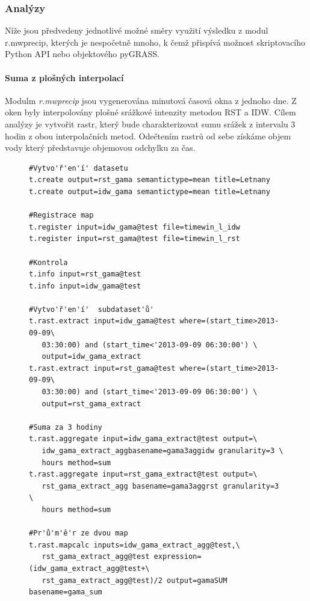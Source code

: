 \documentclass[a4paper,12pt,oneside]{report}
\begin{document}
\subsubsection*{Analýzy}
Níže jsou předvedeny jednotlivé možné směry využití výsledku z modul r.mwprecip, kterých je nespočetně mnoho, k čemž přispívá možnost skriptovacího Python API nebo objektového pyGRASS. 

\paragraph*{Suma z plošných interpolací}
Modulm \emph{r.mwprecip} jsou vygenerována minutová časová okna z jednoho dne. Z oken byly interpolovány plošné srážkové intenzity metodou RST a IDW. Cílem analýzy je vytvořit rastr, který bude charakterizovat sumu srážek z intervalu 3 hodin z obou interpolačních metod. Odečtením rastrů od sebe získáme objem vody který představuje objemovou odchylku za čas.


\begin{figure}[h!]
\begin{footnotesize}
\lstset{extendedchars=false,
escapeinside=''}
\begin{lstlisting}[style=mybash]
#Vytvo'ř'en'í' datasetu
t.create output=rst_gama semantictype=mean title=Letnany
t.create output=idw_gama semantictype=mean title=Letnany

#Registrace map 
t.register input=idw_gama@test file=timewin_l_idw
t.register input=rst_gama@test file=timewin_l_rst

#Kontrola
t.info input=rst_gama@test                                                      
t.info input=idw_gama@test

#Vytvo'ř'en'í'  subdataset'ů'
t.rast.extract input=idw_gama@test where=(start_time>2013-09-09\
   03:30:00) and (start_time<'2013-09-09 06:30:00') \
   output=idw_gama_extract
t.rast.extract input=rst_gama@test where=(start_time>2013-09-09\
   03:30:00) and (start_time<'2013-09-09 06:30:00') \
   output=rst_gama_extract

#Suma za 3 hodiny
t.rast.aggregate input=idw_gama_extract@test output=\
   idw_gama_extract_aggbasename=gama3aggidw granularity=3 \
   hours method=sum
t.rast.aggregate input=rst_gama_extract@test output=\
   rst_gama_extract_agg basename=gama3aggrst granularity=3 \
   hours method=sum

#Pr'ů'm'ě'r ze dvou map
t.rast.mapcalc inputs=idw_gama_extract_agg@test,\
   rst_gama_extract_agg@test expression=(idw_gama_extract_agg@test+\
   rst_gama_extract_agg@test)/2 output=gamaSUM basename=gama_sum
\end{lstlisting}
\end{footnotesize} 
\end{figure}
\end{document}

